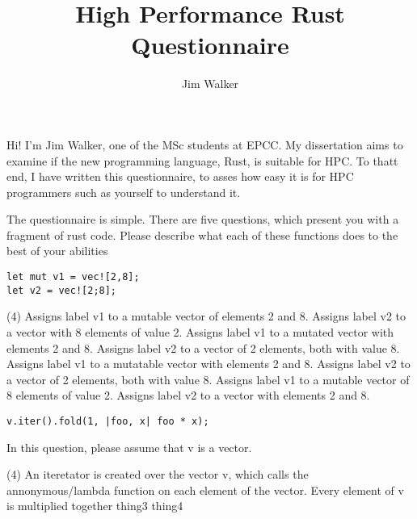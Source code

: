 \documentclass[11pt]{article} %
\begin{document}
\author{Jim Walker}
\title{High Performance Rust Questionnaire}
\maketitle
Hi! I'm Jim Walker, one of the MSc students at EPCC. My dissertation aims to examine if the new programming language, Rust, is suitable for HPC. To thatt end, I have written this questionnaire, to asses how easy it is for HPC programmers such as yourself to understand it.

The questionnaire is simple. There are five questions, which present you with a fragment of rust code. Please describe what each of these functions does to the best of your abilities
\newsavebox\myboxa
\begin{lrbox}{\myboxa}
  \begin{minipage}{\textwidth}
    \begin{lstlisting}
let mut v1 = vec![2,8];
let v2 = vec![2;8];
\end{lstlisting}
\end{minipage}
\end{lrbox}

\begin{question}

\noindent\usebox\myboxa

\begin{tasks}(4)
  \task Assigns label v1 to a mutable vector of elements 2 and 8. Assigns label v2 to a vector with 8 elements of value 2.
  \task Assigns label v1 to a mutated vector with elements 2 and 8. Assigns label v2 to a vector of 2 elements, both with value 8.
  \task Assigns label v1 to a mutatable vector with elements 2 and 8. Assigns label v2 to a vector of 2 elements, both with value 8.
  \task Assigns label v1 to a mutable vector of 8 elements of value 2. Assigns label v2 to a vector with elements 2 and 8.
\end{tasks}

\end{question}

\newsavebox\myboxb
\begin{lrbox}{\myboxb}
  \begin{minipage}{\textwidth}
    \begin{lstlisting}
v.iter().fold(1, |foo, x| foo * x);
\end{lstlisting}
\end{minipage}
\end{lrbox}

\begin{question}
In this question, please assume that v is a vector.

\noindent\usebox\myboxb

\begin{tasks}(4)
  \task An iteretator is created over the vector v, which calls the annonymous/lambda function on each element of the vector.  
  \task Every element of v is multiplied together
  \task thing3
  \task thing4
\end{tasks}

\end{question}
\end{document}
